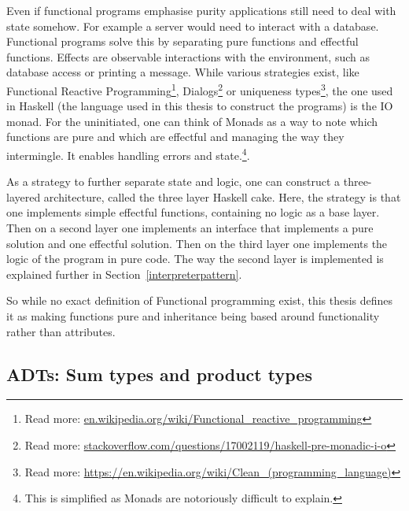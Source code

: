 \begin{description}
Even if functional programs emphasise purity applications still need to deal
        with state somehow. For example a server would need to interact with a
        database. Functional programs solve this by separating pure functions
        and effectful functions. Effects are observable interactions with the
        environment, such as database access or printing a message.  While
        various strategies exist, like Functional Reactive
        Programming\footnote{Read more:
        \url{en.wikipedia.org/wiki/Functional_reactive_programming}},
        Dialogs\footnote{Read more:
        \url{stackoverflow.com/questions/17002119/haskell-pre-monadic-i-o}} or
        uniqueness types\footnote{Read more:
        \url{https://en.wikipedia.org/wiki/Clean_(programming_language)}}, the
        one used in Haskell (the language used in this thesis to construct the
        programs) is the IO monad. For the uninitiated, one can think of Monads
        as a way to note which functions are pure and which are effectful and
        managing the way they intermingle. It enables handling errors
        and state.\footnote{This is simplified as Monads are notoriously
        difficult to explain.}. 

As a strategy to further separate state and logic, one can construct a
        three-layered architecture, called the three layer Haskell cake. Here,
        the strategy is that one implements simple effectful functions,
        containing no logic as a base layer. Then on a second layer one
        implements an interface that implements a pure solution and one
        effectful solution. Then on the third layer one implements the logic of
        the program in pure code. The way the second layer is implemented is
        explained further in Section~\ref{interpreterpattern}. 
\end{description}

So while no exact definition of Functional programming exist, this thesis
defines it as making functions pure and inheritance being based around
functionality rather than attributes.

\subsection{ADTs: Sum types and product types}\label{types}


